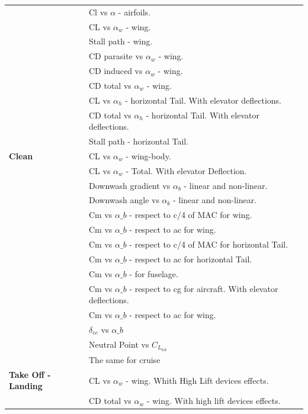 \begin{center}
	\begin{tabular}{| l | l | l |}
		\hline
		&  Cl vs $\alpha$ - airfoils.\\ 
		&CL vs $\alpha_w$ - wing.\\ 
		& Stall path - wing.\\  
		&CD parasite vs $\alpha_w$ - wing.\\  
		&CD induced vs $\alpha_w$ - wing.\\ 
		&CD total vs $\alpha_w$ - wing.\\  
		&CL vs $\alpha_h$ - horizontal Tail. With elevator deflections.\\ 
		&CD total vs $\alpha_h$ - horizontal Tail. With elevator deflections.\\ 
		&Stall path - horizontal Tail.\\ 
		{\bfseries Clean}		 &CL vs $\alpha_w$ - wing-body.\\  
		&CL vs $\alpha_w$ - Total. With elevator Deflection.\\  
		&Downwash gradient vs $\alpha_b$ - linear and non-linear.\\  
		&Downwash angle vs $\alpha_b$ - linear and non-linear.\\ 
		&Cm vs $\alpha\_b$ - respect to c/4 of MAC for wing. \\  
		&Cm vs $\alpha\_b$ - respect to ac for wing. \\
		&Cm vs $\alpha\_b$ - respect to c/4 of MAC for horizontal Tail. \\ \
		&Cm vs $\alpha\_b$ - respect to ac for horizontal Tail. \\ 
		&Cm vs $\alpha\_b$ - for fuselage. \\ 
		&Cm vs $\alpha\_b$ - respect to cg for aircraft. With elevator deflections. \\ 
		&Cm vs $\alpha\_b$ - respect to ac for wing. \\ 
		& $\delta_{ee}$ vs $\alpha\_b$  \\ 
		& Neutral Point vs $C_{L_{tot}}$  \\ \hline 	
		&	 The same for cruise \\ 	
		{\bfseries Take Off -  Landing}	 	& CL vs $\alpha_w$ - wing. Whith High Lift devices effects. \\ 
		&	 CD total vs $\alpha_w$ - wing. With high lift devices effects.\\ \hline   
		\hline
	\end{tabular}
\end{center}

